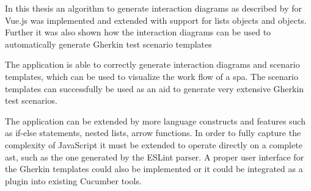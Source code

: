 In this thesis an algorithm to generate interaction diagrams as described by \textcite{zhang2019scenario} for Vue.js was implemented and extended with support for lists objects and objects. Further it was also shown how the interaction diagrams can be used to automatically generate Gherkin test scenario templates

The application is able to correctly generate interaction diagrams and scenario templates, which can be used to visualize the work flow of a \gls{spa}. The scenario templates can successfully be used as an aid to generate very extensive Gherkin test scenarios. 

The application can be extended by more language constructs and features such as if-else statements, nested lists, arrow functions. In order to fully capture the complexity of JavaScript it must be extended to operate directly on a complete \gls{ast}, such as the one generated by the ESLint parser.
A proper user interface for the Gherkin templates could also be implemented or it could be integrated as a plugin into existing Cucumber tools.
